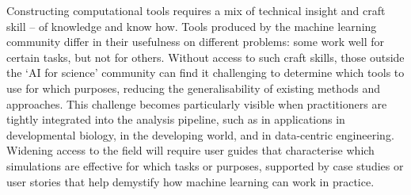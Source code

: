 Constructing computational tools requires a mix of technical insight and
craft skill -- of knowledge and know how. Tools produced by the machine
learning community differ in their usefulness on different problems:
some work well for certain tasks, but not for others. Without access to
such craft skills, those outside the `AI for science' community can find
it challenging to determine which tools to use for which purposes,
reducing the generalisability of existing methods and approaches. This
challenge becomes particularly visible when practitioners are tightly
integrated into the analysis pipeline, such as in applications in
developmental biology, in the developing world, and in data-centric
engineering. Widening access to the field will require user guides that
characterise which simulations are effective for which tasks or
purposes, supported by case studies or user stories that help demystify
how machine learning can work in practice.
